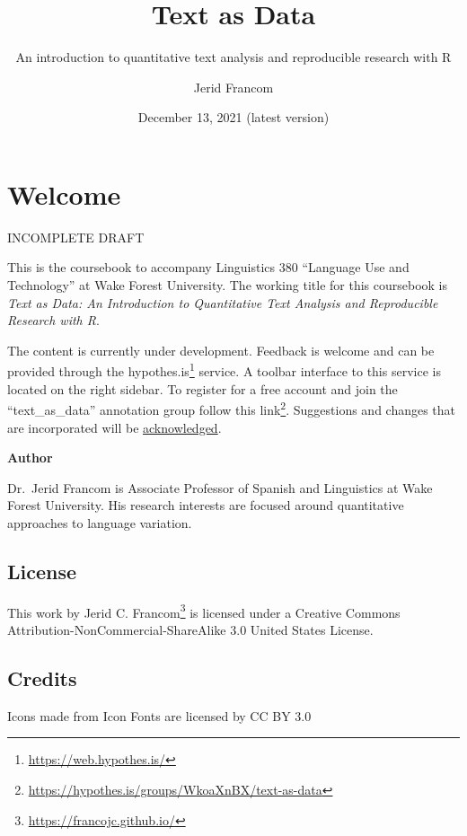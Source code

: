 \documentclass[
]{article}
\title{Text as Data}
\subtitle{An introduction to quantitative text analysis and reproducible research with R}
\author{Jerid Francom}
\date{December 13, 2021 (latest version)}
\DeclareRobustCommand{\href}[2]{#2\footnote{\url{#1}}}
\begin{document}
\maketitle

{
\setcounter{tocdepth}{2}
\tableofcontents
}
\hypertarget{welcome}{%
\section*{Welcome}\label{welcome}}

INCOMPLETE DRAFT

This is the coursebook to accompany Linguistics 380 ``Language Use and Technology'' at Wake Forest University. The working title for this coursebook is \emph{Text as Data: An Introduction to Quantitative Text Analysis and Reproducible Research with R}.

The content is currently under development. Feedback is welcome and can be provided through the \href{https://web.hypothes.is/}{hypothes.is} service. A toolbar interface to this service is located on the right sidebar. To register for a free account and join the ``text\_as\_data'' annotation group \href{https://hypothes.is/groups/WkoaXnBX/text-as-data}{follow this link}. Suggestions and changes that are incorporated will be \protect\hyperlink{acknowledgements}{acknowledged}.

\textbf{Author}

Dr.~Jerid Francom is Associate Professor of Spanish and Linguistics at Wake Forest University. His research interests are focused around quantitative approaches to language variation.

\hypertarget{license}{%
\subsection*{License}\label{license}}

This work by \href{https://francojc.github.io/}{Jerid C. Francom} is licensed under a Creative Commons Attribution-NonCommercial-ShareAlike 3.0 United States License.

\hypertarget{credits}{%
\subsection*{Credits}\label{credits}}

Icons made from Icon Fonts are licensed by CC BY 3.0
\end{document}
